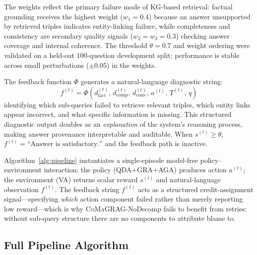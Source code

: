 \documentclass[runningheads]{llncs}
\newcommand{\sys}{\textsc{CoMaGRAG}\xspace}
\begin{document}
The weights reflect the primary failure mode of KG-based retrieval: factual
grounding receives the highest weight ($w_1=0.4$) because an answer unsupported
by retrieved triples indicates entity-linking failure, while completeness and
consistency are secondary quality signals ($w_2=w_3=0.3$) checking answer
coverage and internal coherence. The threshold $\theta=0.7$ and weight ordering
were validated on a held-out 100-question development split; performance is
stable across small perturbations ($\pm0.05$) in the weights.

\begin{definition}
The feedback function $\Phi$ generates a natural-language diagnostic string:
\begin{equation}
  f^{(t)} = \Phi\!\left(d_\text{fact}^{(t)},\,d_\text{comp}^{(t)},\,
                         d_\text{cons}^{(t)},\,a^{(t)},\,T^{(t)},\,q\right)
  \label{eq:feedback}
\end{equation}
identifying which sub-queries failed to retrieve relevant triples, which entity
links appear incorrect, and what specific information is missing. This
structured diagnostic output doubles as an \emph{explanation} of the system's
reasoning process, making answer provenance interpretable and auditable. When
$s^{(t)}\geq\theta$, $f^{(t)}=\text{``Answer is satisfactory.''}\!$ and the
feedback path is inactive.
\end{definition}

\begin{remark}
Algorithm~\ref{alg:pipeline} instantiates a single-episode model-free
policy--environment interaction: the policy (QDA+GRA+AGA) produces action
$a^{(t)}$; the environment (VA) returns scalar reward $s^{(t)}$ and
natural-language observation $f^{(t)}$. The feedback string $f^{(t)}$ acts as
a structured credit-assignment signal---specifying \emph{which} action component
failed rather than merely reporting low reward---which is why \sys-NoDecomp
fails to benefit from retries: without sub-query structure there are no
components to attribute blame to.
\end{remark}

\subsection{Full Pipeline Algorithm}
\end{document}
